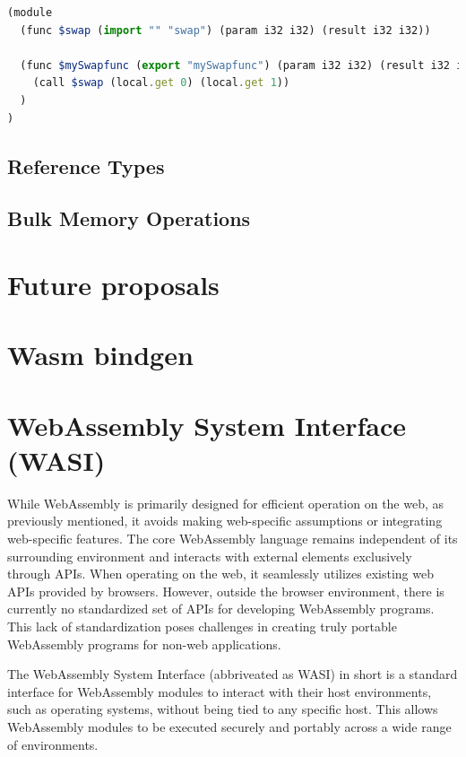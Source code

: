 \begin{lstlisting}[frame=lines, caption=Simple swap function that evaluates the multi return proposal, captionpos=b, language=JavaScript, showstringspaces=false]
(module
  (func $swap (import "" "swap") (param i32 i32) (result i32 i32))

  (func $mySwapfunc (export "mySwapfunc") (param i32 i32) (result i32 i32)
    (call $swap (local.get 0) (local.get 1))
  )
)
\end{lstlisting}

\subsection{Reference Types}

\subsection{Bulk Memory Operations}


\section{Future proposals}
\label{sec:future-proposals}

\section{Wasm bindgen}
\label{sec:wasm-bindgen}

\section{WebAssembly System Interface (WASI)}
\label{sec:wasi}
While WebAssembly is primarily designed for efficient operation on the web, as previously mentioned, it avoids making web-specific assumptions or integrating web-specific features. The core WebAssembly language remains independent of its surrounding environment and interacts with external elements exclusively through APIs. When operating on the web, it seamlessly utilizes existing web APIs provided by browsers. However, outside the browser environment, there is currently no standardized set of APIs for developing WebAssembly programs. This lack of standardization poses challenges in creating truly portable WebAssembly programs for non-web applications.

The WebAssembly System Interface (abbriveated as WASI) in short is a standard interface for WebAssembly modules to interact with their host environments, such as operating systems, without being tied to any specific host. This allows WebAssembly modules to be executed securely and portably across a wide range of environments. 


